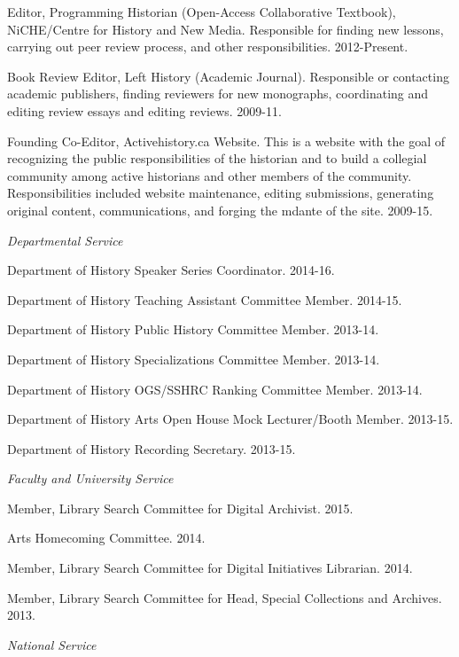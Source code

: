 \documentclass[11pt,article,oneside]{memoir}
\begin{document}
\ind Editor, Programming Historian (Open-Access Collaborative Textbook), NiCHE/Centre for History and New Media. Responsible for finding new lessons, carrying out peer review process, and other responsibilities. 2012-Present.

\ind Book Review Editor, Left History (Academic Journal). Responsible or contacting academic publishers, finding reviewers for new monographs, coordinating and editing review essays and editing reviews. 2009-11.

\ind Founding Co-Editor, Activehistory.ca Website. This is a website with the goal of recognizing the public responsibilities of the historian and to build a collegial community among active historians and other members of the community. Responsibilities included website maintenance, editing submissions, generating original content, communications, and forging the mdante of the site. 2009-15.

\medskip

\noindent\emph{Departmental Service \vspace{0.01in}}

\ind Department of History Speaker Series Coordinator. 2014-16.

\ind Department of History Teaching Assistant Committee Member. 2014-15.

\ind Department of History Public History Committee Member. 2013-14.

\ind Department of History Specializations Committee Member. 2013-14.

\ind Department of History OGS/SSHRC Ranking Committee Member. 2013-14.

\ind Department of History Arts Open House Mock Lecturer/Booth Member. 2013-15.

\ind Department of History Recording Secretary. 2013-15.

\medskip

\noindent\emph{Faculty and University Service \vspace{0.05in}}

\ind Member, Library Search Committee for Digital Archivist. 2015.

\ind Arts Homecoming Committee. 2014.

\ind Member, Library Search Committee for Digital Initiatives Librarian. 2014.

\ind Member, Library Search Committee for Head, Special Collections and Archives. 2013.

\medskip

\noindent\emph{National Service \vspace{0.05in}}
\end{document}
